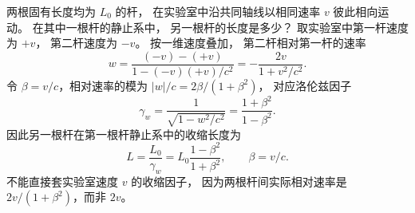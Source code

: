 两根固有长度均为 $L_0$ 的杆，
在实验室中沿共同轴线以相同速率 $v$
彼此相向运动。
在其中一根杆的静止系中，
另一根杆的长度是多少？
\exsolution
取实验室中第一杆速度为 $+v$，
第二杆速度为 $-v$。
按一维速度叠加，
第二杆相对第一杆的速率
\[
w=\frac{(-v)-(+v)}{1-(-v)(+v)/c^2}
=-\frac{2v}{1+v^2/c^2}.
\]
令 $\beta=v/c$，相对速率的模为
$|w|/c=2\beta/(1+\beta^2)$，
对应洛伦兹因子
\[
\gamma_w=
\frac1{\sqrt{1-w^2/c^2}}
=\frac{1+\beta^2}{1-\beta^2}.
\]
因此另一根杆在第一根杆静止系中的收缩长度为
\[
\boxed{L=\frac{L_0}{\gamma_w}
=L_0\frac{1-\beta^2}{1+\beta^2}},
\qquad\beta=v/c.
\]
\excheck 不能直接套实验室速度 $v$ 的收缩因子，
因为两根杆间实际相对速率是
$2v/(1+\beta^2)$，而非 $2v$。
